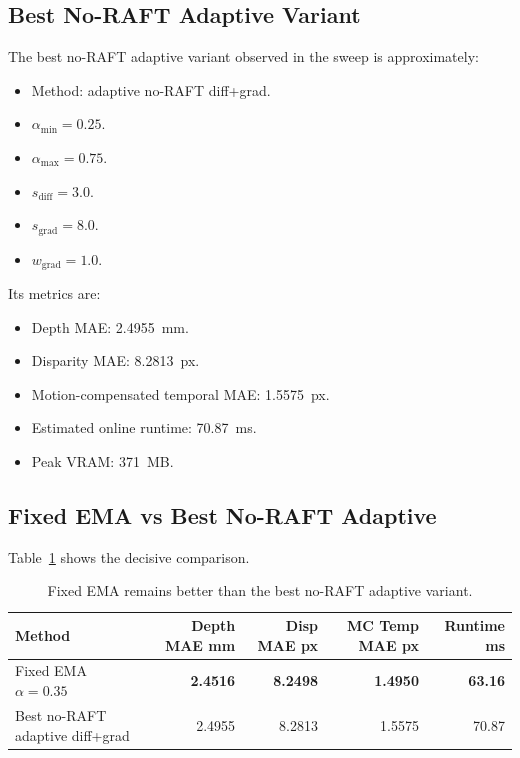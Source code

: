 \documentclass[11pt,a4paper]{article}
\begin{document}
\subsection{Best No-RAFT Adaptive Variant}

The best no-RAFT adaptive variant observed in the sweep is approximately:

\begin{itemize}[leftmargin=*]
    \item Method: adaptive no-RAFT diff+grad.
    \item $\alpha_{\min}=0.25$.
    \item $\alpha_{\max}=0.75$.
    \item $s_{\mathrm{diff}}=3.0$.
    \item $s_{\mathrm{grad}}=8.0$.
    \item $w_{\mathrm{grad}}=1.0$.
\end{itemize}

Its metrics are:

\begin{itemize}[leftmargin=*]
    \item Depth MAE: \SI{2.4955}{mm}.
    \item Disparity MAE: \SI{8.2813}{px}.
    \item Motion-compensated temporal MAE: \SI{1.5575}{px}.
    \item Estimated online runtime: \SI{70.87}{ms}.
    \item Peak VRAM: \SI{371}{MB}.
\end{itemize}

\subsection{Fixed EMA vs Best No-RAFT Adaptive}

Table~\ref{tab:fixed-vs-adaptive} shows the decisive comparison.

\begin{table}[htbp]
\centering
\caption{Fixed EMA remains better than the best no-RAFT adaptive variant.}
\label{tab:fixed-vs-adaptive}
\small
\begin{tabularx}{\textwidth}{lrrrr}
\toprule
Method & Depth MAE mm & Disp MAE px & MC Temp MAE px & Runtime ms \\
\midrule
Fixed EMA $\alpha=0.35$ & \textbf{2.4516} & \textbf{8.2498} & \textbf{1.4950} & \textbf{63.16} \\
Best no-RAFT adaptive diff+grad & 2.4955 & 8.2813 & 1.5575 & 70.87 \\
\bottomrule
\end{tabularx}
\end{table}
\end{document}
